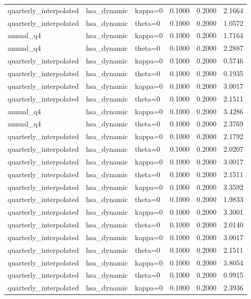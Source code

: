 \begin{tabular}{lllrrr}
quarterly\_interpolated & hsa\_dynamic & kappa=0 & 0.1000 & 0.2000 & 2.1664 \\
quarterly\_interpolated & hsa\_dynamic & theta=0 & 0.1000 & 0.2000 & 1.0572 \\
annual\_q4 & hsa\_dynamic & kappa=0 & 0.1000 & 0.2000 & 1.7164 \\
annual\_q4 & hsa\_dynamic & theta=0 & 0.1000 & 0.2000 & 2.2887 \\
quarterly\_interpolated & hsa\_dynamic & kappa=0 & 0.1000 & 0.2000 & 0.5746 \\
quarterly\_interpolated & hsa\_dynamic & theta=0 & 0.1000 & 0.2000 & 0.1935 \\
quarterly\_interpolated & hsa\_dynamic & kappa=0 & 0.1000 & 0.2000 & 3.0017 \\
quarterly\_interpolated & hsa\_dynamic & theta=0 & 0.1000 & 0.2000 & 2.1511 \\
annual\_q4 & hsa\_dynamic & kappa=0 & 0.1000 & 0.2000 & 3.4286 \\
annual\_q4 & hsa\_dynamic & theta=0 & 0.1000 & 0.2000 & 2.3769 \\
quarterly\_interpolated & hsa\_dynamic & kappa=0 & 0.1000 & 0.2000 & 2.1792 \\
quarterly\_interpolated & hsa\_dynamic & theta=0 & 0.1000 & 0.2000 & 2.0207 \\
quarterly\_interpolated & hsa\_dynamic & kappa=0 & 0.1000 & 0.2000 & 3.0017 \\
quarterly\_interpolated & hsa\_dynamic & theta=0 & 0.1000 & 0.2000 & 2.1511 \\
quarterly\_interpolated & hsa\_dynamic & kappa=0 & 0.1000 & 0.2000 & 3.3592 \\
quarterly\_interpolated & hsa\_dynamic & theta=0 & 0.1000 & 0.2000 & 1.9833 \\
quarterly\_interpolated & hsa\_dynamic & kappa=0 & 0.1000 & 0.2000 & 3.3001 \\
quarterly\_interpolated & hsa\_dynamic & theta=0 & 0.1000 & 0.2000 & 2.0140 \\
quarterly\_interpolated & hsa\_dynamic & kappa=0 & 0.1000 & 0.2000 & 3.0017 \\
quarterly\_interpolated & hsa\_dynamic & theta=0 & 0.1000 & 0.2000 & 2.1511 \\
quarterly\_interpolated & hsa\_dynamic & kappa=0 & 0.1000 & 0.2000 & 3.8054 \\
quarterly\_interpolated & hsa\_dynamic & theta=0 & 0.1000 & 0.2000 & 0.9915 \\
quarterly\_interpolated & hsa\_dynamic & kappa=0 & 0.1000 & 0.2000 & 2.3936 \\

\end{tabular}
